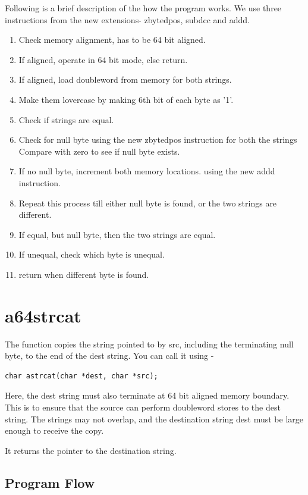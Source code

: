 \documentclass[12pt]{article}
\begin{document}
Following is a brief description of the how the program works. We use three instructions from the new extensions- zbytedpos, subdcc and addd. 

\begin{enumerate}
   \item Check memory alignment, has to be 64 bit aligned.
    \item If aligned, operate in 64 bit mode, else return.
    \item If aligned, load doubleword from memory for both strings.
    \item Make them lovercase by making 6th bit of each byte as '1'.
    \item Check if strings are equal.
    \item Check for null byte using the new zbytedpos instruction for both the strings Compare with zero to see if null byte exists.
    \item If no null byte, increment both memory locations.
    using the new addd instruction.
    \item Repeat this process till either null byte is found, or the two strings are different.
    \item If equal, but null byte, then the two strings are equal.
    \item If unequal, check which byte is unequal.
    \item return when different byte is found.
    
\end{enumerate}

\section{a64strcat}
The function copies the string pointed to by src, including the terminating null byte, to the end of the dest string. You can call it using -
\begin{verbatim}
char astrcat(char *dest, char *src);
\end{verbatim}


Here, the dest string must also terminate at 64 bit aligned memory boundary. This is to ensure that the source can perform doubleword stores to the dest string.
The strings may not overlap, and the destination string dest must be large enough to receive the copy.

It returns the pointer to the destination string.

\subsection{Program Flow}
\end{document}
